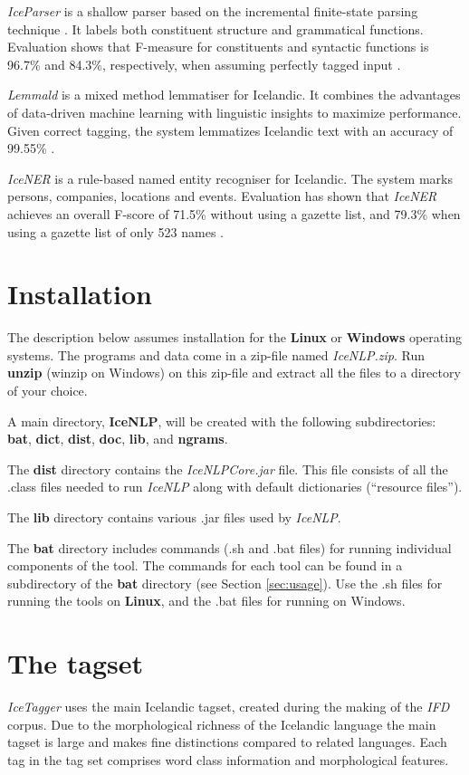 \documentclass[11pt]{article}
\begin{document}
\emph{IceParser} is a shallow parser based on the incremental finite-state parsing technique \citep{mok97}.
It labels both constituent structure and grammatical functions.
Evaluation shows that F-measure for constituents and syntactic functions is 96.7\% and 84.3\%, respectively, when assuming perfectly tagged input \citep{lof07b}.

\emph{Lemmald} is a mixed method lemmatiser for Icelandic.
It combines the advantages of data-driven machine learning with linguistic insights to maximize performance.
Given correct tagging, the system lemmatizes Icelandic text with an accuracy of 99.55\% \citep{ant08}.

\emph{IceNER} is a rule-based named entity recogniser for Icelandic.
The system marks persons, companies, locations and events.
Evaluation has shown that \emph{IceNER} achieves an overall F-score of 71.5\% without using a gazette list, and 79.3\% when using a gazette list of only 523 names \citep{try09}.

\section{Installation}
The description below assumes installation for the {\bf Linux} or {\bf Windows} operating systems.
The programs and data come in a zip-file named \emph{IceNLP.zip}.
Run {\bf unzip} (winzip on Windows) on this zip-file and extract all the files to a directory of your choice.

A main directory, {\bf IceNLP}, will be created with the following subdirectories: {\bf bat}, {\bf dict}, {\bf dist}, {\bf doc}, {\bf lib}, and {\bf ngrams}.

The {\bf dist} directory contains the \emph{IceNLPCore.jar} file.  This file consists of all the .class files needed to run \emph{IceNLP} along with default dictionaries (``resource files''). 

The {\bf lib} directory contains various .jar files used by \emph{IceNLP}. 

The {\bf bat} directory includes commands (.sh and .bat files) for running individual components of the tool.
The commands for each tool can be found in a subdirectory of the {\bf bat} directory (see Section \ref{sec:usage}).
Use the .sh files for running the tools on \textbf{Linux}, and the .bat files for running on Windows.

\section{The tagset}
\label{sec:tagset}
\emph{IceTagger} uses the main Icelandic tagset, created during the making of the \emph{IFD} corpus.
Due to the morphological richness of the Icelandic language the main tagset is large and makes fine distinctions compared to related languages.
Each tag in the tag set comprises word class information and morphological features.
\end{document}
